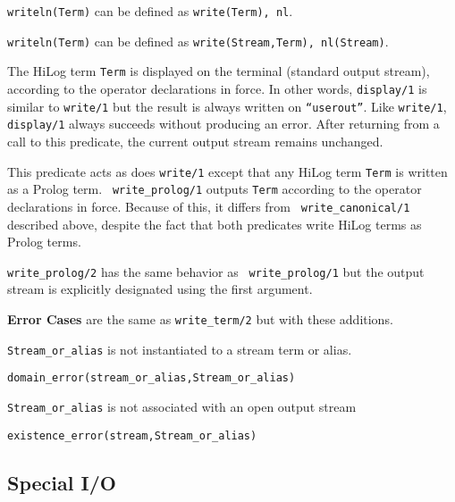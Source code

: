 \begin{description}
    {\tt writeln(Term)} can be defined as {\tt write(Term), nl}.

    {\tt writeln(Term)} can be defined as {\tt write(Stream,Term),
    nl(Stream)}.

    The HiLog term {\tt Term} is displayed on the terminal (standard output 
    stream), according to the operator declarations in force. In other words,
    {\tt display/1} is similar to {\tt write/1} but the result is always
    written on {\tt ``userout''}\@.  Like {\tt write/1}, {\tt display/1} 
    always succeeds without producing an error. After returning from a call 
    to this predicate, the current output stream remains unchanged.

    This predicate acts as does {\tt write/1} except that any HiLog
    term {\tt Term} is written as a Prolog term.  {\tt
    write\_prolog/1} outputs {\tt Term} according to the operator
    declarations in force.  Because of this, it differs from {\tt
    write\_canonical/1} described above, despite the fact that both
    predicates write HiLog terms as Prolog terms.

	{\tt write\_prolog/2} has the same behavior as {\tt
	write\_prolog/1} but the output stream is explicitly
	designated using the first argument.

{\bf Error Cases} are the same as {\tt write\_term/2} but with these
additions.
\bi
\item 	{\tt Stream\_or\_alias} is not instantiated to a stream term
or alias.
\bi
\item 	{\tt domain\_error(stream\_or\_alias,Stream\_or\_alias)}
\ei
\item 	{\tt Stream\_or\_alias} is not associated with an open output stream
\bi
\item 	{\tt existence\_error(stream,Stream\_or\_alias)}
\ei
\ei

\end{description}

\subsection{Special I/O}

